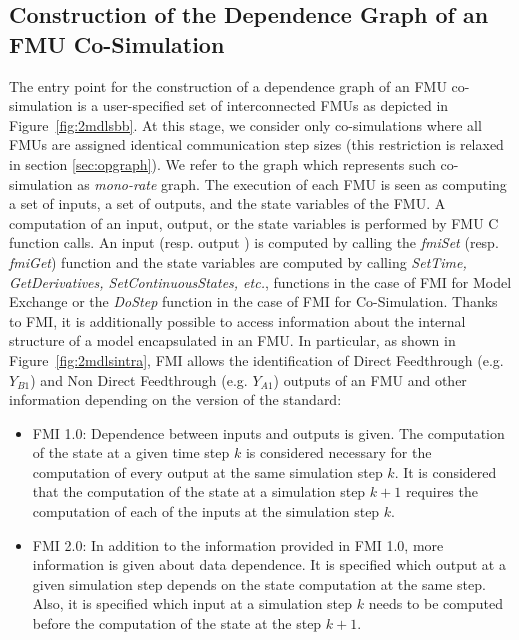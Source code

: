 \subsection{Construction of the Dependence Graph of an FMU Co-Simulation}

The entry point for the construction of a dependence graph of an FMU co-simulation is a user-specified set of interconnected FMUs as depicted in Figure~\ref{fig:2mdlsbb}. At this stage, we consider only co-simulations where all FMUs are assigned identical communication step sizes (this restriction is relaxed in section \ref{sec:opgraph}). We refer to the graph which represents such co-simulation as \textit{mono-rate} graph. The execution of each FMU is seen as computing a set of inputs, a set of outputs, and the state variables of the FMU. A computation of an input, output, or the state variables is performed by FMU C function calls. An input (resp. output ) is computed by calling the \textit{fmiSet} (resp. \textit{fmiGet}) function and the state variables are computed by calling \textit{SetTime, GetDerivatives, SetContinuousStates, etc.}, functions in the case of FMI for Model Exchange or the \textit{DoStep} function in the case of FMI for Co-Simulation. Thanks to FMI, it is additionally possible to access information about the internal structure of a model encapsulated in an FMU. In particular, as shown in Figure~\ref{fig:2mdlsintra}, FMI allows the identification of Direct Feedthrough (e.g. $Y_{B1}$) and Non Direct Feedthrough (e.g. $Y_{A1}$) outputs of an FMU and other information depending on the version of the standard:

\begin{itemize}
\item FMI 1.0: Dependence between inputs and outputs is given. The computation of the state at a given time step $k$ is considered necessary for the computation of every output at the same simulation step $k$. It is considered that the computation of the state at a simulation step $k+1$ requires the computation of each of the inputs at the simulation step $k$.
\item FMI 2.0: In addition to the information provided in FMI 1.0, more information is given about data dependence. It is specified which output at a given simulation step depends on the state computation at the same step. Also, it is specified which input at a simulation step $k$ needs to be computed before the computation of the state at the step $k+1$.  
\end{itemize}

